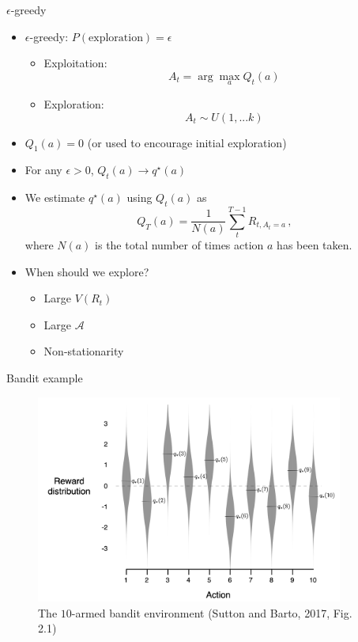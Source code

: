 \documentclass[10pt]{beamer}
\begin{document}
\begin{frame}{$\epsilon$-greedy}

\begin{itemize}
\item $\epsilon$-greedy: $P(\text{exploration}) = \epsilon$ \pause
\begin{itemize}
\item Exploitation:
\[
A_t = \arg \max_a Q_t(a)
\]
\pause
\item Exploration:
\[
A_t \sim U(1,...k)
\]
\pause
\end{itemize}
\item $Q_1(a) = 0$ (or used to encourage initial exploration)\pause
\item For any $\epsilon > 0$, $Q_t(a) \rightarrow q^\star(a)$\pause
\item We estimate $q^\star(a)$ using $Q_t(a)$ as
\[
Q_T(a) = \frac{1}{N(a)} \sum^{T-1}_t R_{t,A_t=a}\,,
\]
where $N(a)$ is the total number of times action $a$ has been taken.
\pause
\item When should we explore?
\begin{itemize}
\item Large $V(R_t)$\pause
\item Large $\mathcal{A}$\pause
\item Non-stationarity
\end{itemize}
\end{itemize}

\end{frame}


\begin{frame}{Bandit example}

\begin{figure}[h]
\centering
\includegraphics[width=0.9\textwidth]{fig/sutton_fig_2_1.png}
\caption{The $10$-armed bandit environment (Sutton and Barto, 2017, Fig. 2.1)}
\end{figure}

\end{frame}
\end{document}
